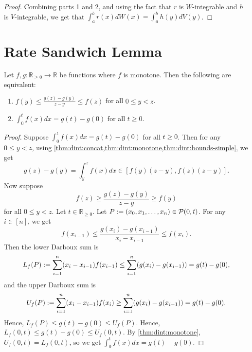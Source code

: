 \documentclass[a4paper,12pt,fleqn]{article}
\begin{document}
\begin{proof}
Combining parts 1 and 2, and using the fact that $r$ is $W$-integrable
and $h$ is $V$-integrable, we get that
$\int_a^b r(x)dW(x) = \int_a^b h(y)dV(y)$.
\end{proof}

\section{Rate Sandwich Lemma}

\begin{lemma}
\label{thm:monotone-integral-value-2}
Let $f, g: \mathbb{R}_{\ge 0} \to \mathbb{R}$ be functions where $f$ is monotone.
Then the following are equivalent:
\begin{enumerate}
\item $\displaystyle f(y) \le \frac{g(z) - g(y)}{z - y} \le f(z)$ for all $0 \le y < z$.
\item $\int_0^t f(x)dx = g(t) - g(0)$ for all $t \ge 0$.
\end{enumerate}
\end{lemma}
\begin{proof}
Suppose $\int_0^t f(x)dx = g(t) - g(0)$ for all $t \ge 0$.
Then for any $0 \le y < z$, using
\cref{thm:dint:concat,thm:dint:monotone,thm:dint:bounds-simple}, we get
\[ g(z) - g(y) = \int_y^z f(x)dx \in [f(y)(z-y), f(z)(z - y)]. \]
Now suppose
\[ f(z) \ge \frac{g(z) - g(y)}{z - y} \ge f(y) \]
for all $0 \le y < z$. Let $t \in \mathbb{R}_{\ge 0}$.
Let $P := (x_0, x_1, \ldots, x_n) \in \mathcal{P}(0, t)$.
For any $i \in [n]$, we get
\[ f(x_{i-1}) \le \frac{g(x_i) - g(x_{i-1})}{x_i - x_{i-1}} \le f(x_i). \]
Then the lower Darboux sum is
\[ L_f(P) := \sum_{i=1}^n (x_i - x_{i-1})f(x_{i-1})
\le \sum_{i=1}^n (g(x_i) - g(x_{i-1}))
= g(t) - g(0), \]
and the upper Darboux sum is
\[ U_f(P) := \sum_{i=1}^n (x_i - x_{i-1})f(x_i)
\ge \sum_{i=1}^n (g(x_i) - g(x_{i-1}))
= g(t) - g(0). \]
Hence, $L_f(P) \le g(t) - g(0) \le U_f(P)$.
Hence, $L_f(0, t) \le g(t) - g(0) \le U_f(0, t)$.
By \cref{thm:dint:monotone}, $U_f(0, t) = L_f(0, t)$,
so we get $\int_0^t f(x)dx = g(t) - g(0)$.
\end{proof}
\end{document}
